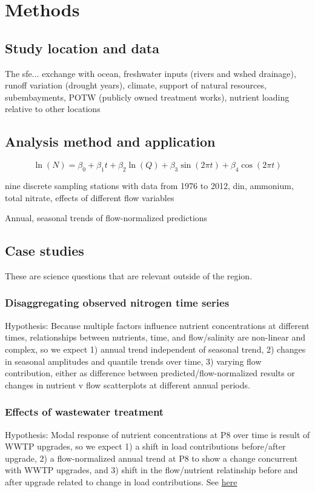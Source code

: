\documentclass[letterpaper,12pt,oneside]{article}\usepackage[]{graphicx}\usepackage[]{color}
\begin{document}
\section{Methods}

\subsection{Study location and data}

The \ac{sfe}... exchange with ocean, freshwater inputs (rivers and wshed drainage), runoff variation (drought years), climate, support of natural resources, subembayments, POTW (publicly owned treatment works), nutrient loading relative to other locations
\subsection{Analysis method and application}

\begin{equation}
\ln\left(N\right) = \beta_0 + \beta_1 t + \beta_2 \ln\left(Q\right) + \beta_3 \sin\left(2\pi t\right) + \beta_4 \cos\left(2\pi t\right)
\end{equation}

nine discrete sampling stations with data from 1976 to 2012, \ac{din}, ammonium, total nitrate, effects of different flow variables

Annual, seasonal trends of flow-normalized predictions

\subsection{Case studies}
These are science questions that are relevant outside of the region.
\subsubsection{Disaggregating observed nitrogen time series}
Hypothesis: Because multiple factors influence nutrient concentrations at different times, relationships between nutrients, time, and flow/salinity are non-linear and complex, so we expect 1) annual trend independent of seasonal trend, 2) changes in seasonal amplitudes and quantile trends over time, 3) varying flow contribution, either as difference between predicted/flow-normalized results or changes in nutrient v flow scatterplots at different annual periods.
\subsubsection{Effects of wastewater treatment}
Hypothesis: Modal response of nutrient concentrations at P8 over time is result of WWTP upgrades, so we expect 1) a shift in load contributions before/after upgrade, 2) a flow-normalized annual trend at P8 to show a change concurrent with WWTP upgrades, and 3) shift in the flow/nutrient relatinship before and after upgrade related to change in load contributions. See \href{http://www.waterboards.ca.gov/centralvalley/board_decisions/adopted_orders/san_joaquin/r5-2008-0086_res.pdf}{here}
\end{document}
